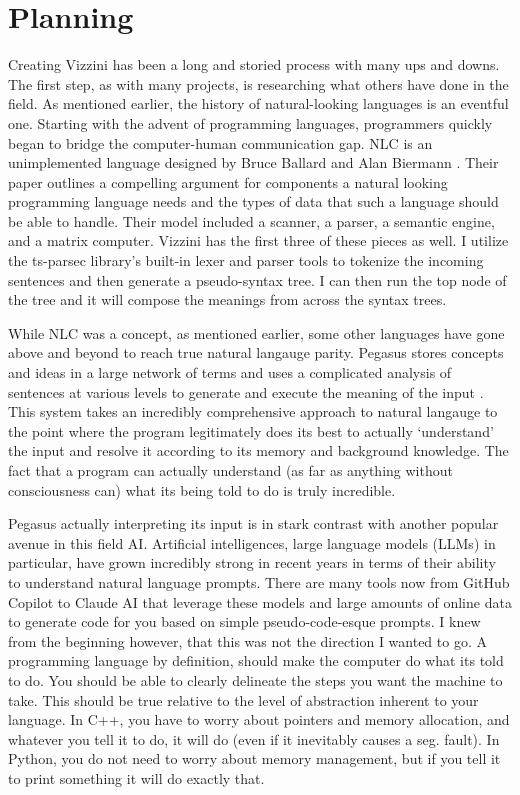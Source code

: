 \documentclass[titlepage]{article}
\newcommand{\langName}{Vizzini}
\begin{document}
\section*{Planning}
Creating \langName{} has been a long and storied process with many ups and downs. The first step, as with many projects, is researching what others have done in the field. As mentioned earlier, the history of natural-looking languages is an eventful one. Starting with the advent of programming languages, programmers quickly began to bridge the computer-human communication gap. NLC is an unimplemented language designed by Bruce Ballard and Alan Biermann \cite{Ballard1979ProgrammingIN}. Their paper outlines a compelling argument for components a natural looking programming language needs and the types of data that such a language should be able to handle. Their model included a scanner, a parser, a semantic engine, and a matrix computer. \langName{} has the first three of these pieces as well. I utilize the ts-parsec library's built-in lexer and parser tools to tokenize the incoming sentences and then generate a pseudo-syntax tree. I can then run the top node of the tree and it will compose the meanings from across the syntax trees.

While NLC was a concept, as mentioned earlier, some other languages have gone above and beyond to reach true natural langauge parity. Pegasus stores concepts and ideas in a large network of terms and uses a complicated analysis of sentences at various levels to generate and execute the meaning of the input \cite{Knöll2006PegasusFS}. This system takes an incredibly comprehensive approach to natural langauge to the point where the program legitimately does its best to actually `understand' the input and resolve it according to its memory and background knowledge. The fact that a program can actually understand (as far as anything without consciousness can) what its being told to do is truly incredible.

Pegasus actually interpreting its input is in stark contrast with another popular avenue in this field AI. Artificial intelligences, large language models (LLMs) in particular, have grown incredibly strong in recent years in terms of their ability to understand natural language prompts. There are many tools now from GitHub Copilot to Claude AI that leverage these models and large amounts of online data to generate code for you based on simple pseudo-code-esque prompts. I knew from the beginning however, that this was not the direction I wanted to go. A programming language by definition, should make the computer do what its told to do. You should be able to clearly delineate the steps you want the machine to take. This should be true relative to the level of abstraction inherent to your language. In C++, you have to worry about pointers and memory allocation, and whatever you tell it to do, it will do (even if it inevitably causes a seg. fault). In Python, you do not need to worry about memory management, but if you tell it to print something it will do exactly that.
\end{document}
